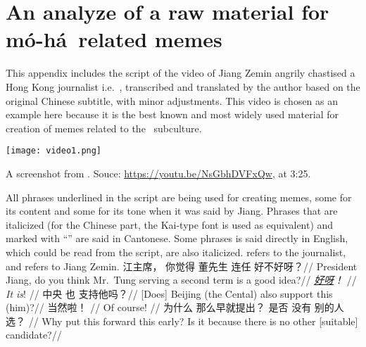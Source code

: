\clearpage
\section[An analyze of a raw material for \moha\ related memes]{An analyze of a raw material for {\sc m\'o-h\'a}\ related memes}
\label{script}
This appendix includes the script of the video of Jiang Zemin angrily chastised a Hong Kong journalist i.e.\ , transcribed and translated by the author based on the original Chinese subtitle, with minor adjustments. This video is chosen as an example here because it is the best known and most widely used material for creation of memes related to the \moha\ subculture.
\begin{marginfigure}
	\texttt{[image: video1.png]}
	\caption[A screenshot from ]{A screenshot from . Souce: \url{https://youtu.be/NsGbhDVFxQw}, at 3:25.}
\end{marginfigure}
All phrases underlined in the script are being used for creating memes, some for its content and some for its tone when it was said by Jiang. Phrases that are italicized (for the Chinese part, the Kai-type font is used as equivalent) and marked with ``\cann'' are said in Cantonese. Some phrases is said directly in English, which could be read from the script, are also italicized.  refers to the journalist, and  refers to Jiang Zemin.
\ex[glhangstyle=none, everygla=\rm, exnoformat=X:, exno={\smallcaps{jo}}, belowexskip=0pt]
\begingl
\gla
{江主席，} {你觉得} {董先生} {连任} {好不好呀？}//
\glb
{President Jiang,} {do you think} {Mr.\ Tung} {serving a second term} {is a good idea?}//
\endgl
\xe
\ex[glhangstyle=none, everygla=\rm, exnoformat=X:, exno={\smallcaps{ji}}, belowexskip=0pt, aboveexskip=-.5cm]
\begingl
\gla
{\it \underline{好呀}！\rm \cann} {}//
\glb
{\textit{It is}!} {}//
\endgl
\xe
\ex[glhangstyle=none, everygla=\rm, exnoformat=X:, exno={\smallcaps{jo}}, belowexskip=0pt, aboveexskip=-.5cm]
\begingl
\gla
{} {中央} {也} {支持他吗？}//
\glb
{[Does]} {Beijing (the Cental)} {also} {support this (him)?}//
\endgl
\xe
\ex[glhangstyle=none, everygla=\rm, exnoformat=X:, exno={\smallcaps{ji}}, belowexskip=0pt, aboveexskip=-.5cm]
\begingl
\gla
{当然啦！} {}//
\glb
{Of course!} {}//
\endgl
\xe
\ex[glhangstyle=none, everygla=\rm, exnoformat=X:, exno={\smallcaps{jo}}, belowexskip=0pt, aboveexskip=-.5cm]
\begingl
\gla
{为什么} {那么早就提出？} {是否} {没有} {别的人选？} //
\glb
{Why} {put this forward this early?} {Is it because} {there is no} {other [suitable] candidate?}//
